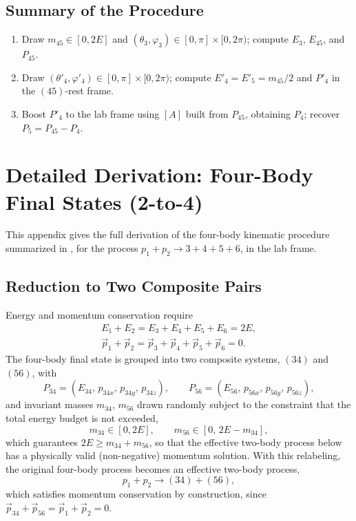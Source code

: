 \documentclass{article}
\begin{document}
\subsection{Summary of the Procedure}
\begin{enumerate}
    \item Draw $m_{45} \in [0, 2E]$ and $(\theta_3, \varphi_3) \in [0,\pi]\times[0,2\pi)$; compute $E_3$, $E_{45}$, and $P_{45}$.
    \item Draw $(\theta'_4, \varphi'_4) \in [0,\pi]\times[0,2\pi)$; compute $E'_4 = E'_5 = m_{45}/2$ and $P'_4$ in the $(45)$-rest frame.
    \item Boost $P'_4$ to the lab frame using $[A]$ built from $P_{45}$, obtaining $P_4$; recover $P_5 = P_{45} - P_4$.
\end{enumerate}

\section{Detailed Derivation: Four-Body Final States (2-to-4)}
\label{app:2to4}
This appendix gives the full derivation of the four-body kinematic procedure summarized in , for the process $p_1 + p_2 \rightarrow 3 + 4 + 5 + 6$, in the lab frame.

\subsection{Reduction to Two Composite Pairs}
Energy and momentum conservation require
\begin{equation}
\begin{gathered}
    E_1 + E_2 = E_3 + E_4 + E_5 + E_6 = 2E, \\
    \vec{p}_1 + \vec{p}_2 = \vec{p}_3 + \vec{p}_4 + \vec{p}_5 + \vec{p}_6 = 0.
\end{gathered}
\end{equation}
The four-body final state is grouped into two composite systems, $(34)$ and $(56)$, with
\begin{equation}
    P_{34} = (E_{34},\, p_{34x},\, p_{34y},\, p_{34z}), \qquad P_{56} = (E_{56},\, p_{56x},\, p_{56y},\, p_{56z}),
\end{equation}
and invariant masses $m_{34}$, $m_{56}$ drawn randomly subject to the constraint that the total energy budget is not exceeded,
\begin{equation}
    m_{34} \in [0, 2E], \qquad m_{56} \in [0,\, 2E - m_{34}],
\end{equation}
which guarantees $2E \geq m_{34} + m_{56}$, so that the effective two-body process below has a physically valid (non-negative) momentum solution. With this relabeling, the original four-body process becomes an effective two-body process,
\begin{equation}
    p_1 + p_2 \rightarrow (34) + (56),
\end{equation}
which satisfies momentum conservation by construction, since $\vec{p}_{34} + \vec{p}_{56} = \vec{p}_1 + \vec{p}_2 = 0$.
\end{document}
